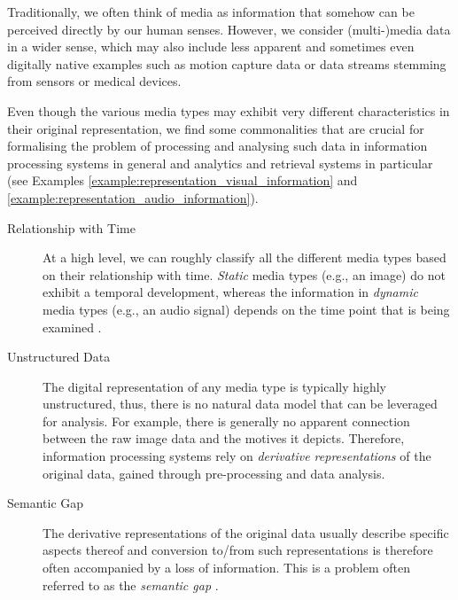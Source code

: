 Traditionally, we often think of media as information that somehow can be perceived directly by our human senses. However, we consider (multi-)media data in a wider sense, which may also include less apparent and sometimes even digitally native examples such as motion capture data or data streams stemming from sensors or medical devices. 

Even though the various media types may exhibit very different characteristics in their original representation, we find some commonalities that are crucial for formalising the problem of processing and analysing such data in information processing systems in general and analytics and retrieval systems in particular (see Examples \ref{example:representation_visual_information} and \ref{example:representation_audio_information}).

\begin{description}
    \item[Relationship with Time] At a high level, we can roughly classify all the different media types based on their relationship with time. \emph{Static} media types (e.g., an image) do not exhibit a temporal development, whereas the information in \emph{dynamic} media types (e.g., an audio signal) depends on the time point that is being examined \cite{Blanken:2007multimedia}.

    \item[Unstructured Data] The digital representation of any media type is typically highly unstructured, thus, there is no natural data model that can be leveraged for analysis. For example, there is generally no apparent connection between the raw image data and the motives it depicts. Therefore, information processing systems rely on \emph{derivative representations} of the original data, gained through pre-processing and data analysis.
    
    \item[Semantic Gap] The derivative representations of the original data usually describe specific aspects thereof and conversion to/from such representations is therefore often accompanied by a loss of information. This is a problem often referred to as the \emph{semantic gap} \cite{Blanken:2007multimedia, Rossetto:2018thesis}.
\end{description}

